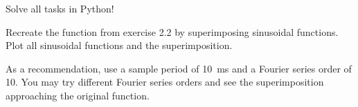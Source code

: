 \begin{solution}
\end{solution}

\begin{question}[subtitle={Python Programming: Fourier Series}]
	Solve all tasks in Python!
	
	Recreate the function from exercise 2.2 by superimposing sinusoidal functions. Plot all sinusoidal functions and the superimposition.
	
	As a recommendation, use a sample period of \SI{10}{ms} and a Fourier series order of 10. You may try different Fourier series orders and see the superimposition approaching the original function.
\end{question}

\begin{solution}
\end{solution}
